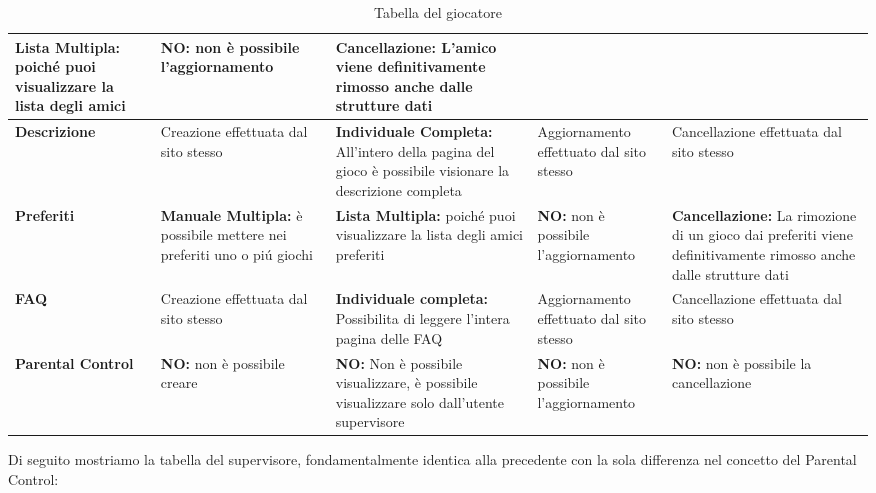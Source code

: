 \documentclass[../Report.tex]{subfiles}
\begin{document}
\begin{table}[H]
\begin{tabular}{|p{2.5cm}|p{3.5cm}|p{3.5cm}|p{3.5cm}|p{3.5cm}|}
            \textbf{Lista Multipla:} poiché puoi visualizzare la lista degli amici
             & \cellcolor{red} \textbf{NO:} non è possibile l’aggiornamento  & \cellcolor{gray} \textbf{Cancellazione:} L’amico viene definitivamente rimosso anche dalle strutture dati\\
            \hline
            \textbf{Descrizione} & \cellcolor{red} Creazione effettuata dal sito stesso & \cellcolor{gray} \textbf{Individuale Completa:} All’intero della pagina del gioco è possibile visionare la descrizione completa & \cellcolor{red} Aggiornamento effettuato dal sito stesso & \cellcolor{red} Cancellazione effettuata dal sito stesso \\
            \hline
            \textbf{Preferiti} & \cellcolor{gray} \textbf{Manuale Multipla:} è possibile mettere nei preferiti uno o piú giochi & \cellcolor{gray} \textbf{Lista Multipla:} poiché puoi visualizzare la lista degli amici preferiti & \cellcolor{red} \textbf{NO:} non è possibile l’aggiornamento & \cellcolor{gray} \textbf{Cancellazione:} La rimozione di un gioco dai preferiti viene definitivamente rimosso anche dalle strutture dati\\
            \hline
            \textbf{FAQ} & \cellcolor{gray} Creazione effettuata dal sito stesso & \cellcolor{green} \textbf{Individuale completa:} Possibilita di leggere l'intera pagina delle FAQ & \cellcolor{red} Aggiornamento effettuato dal sito stesso & \cellcolor{gray} Cancellazione effettuata dal sito stesso \\
            \hline
            \textbf{Parental Control} & \cellcolor{red} \textbf{NO:} non è possibile creare & \cellcolor{red} \textbf{NO:} Non è possibile visualizzare, è possibile visualizzare solo dall’utente supervisore & \cellcolor{red} \textbf{NO:} non è possibile l’aggiornamento & \cellcolor{red} \textbf{NO:} non è possibile la cancellazione \\
            \hline
        \end{tabular}
        \caption{\label{tab:giocatore}Tabella del giocatore}
    \end{table}



    Di seguito mostriamo la tabella del supervisore, fondamentalmente identica alla precedente con la sola differenza nel concetto del Parental Control:
\end{document}
